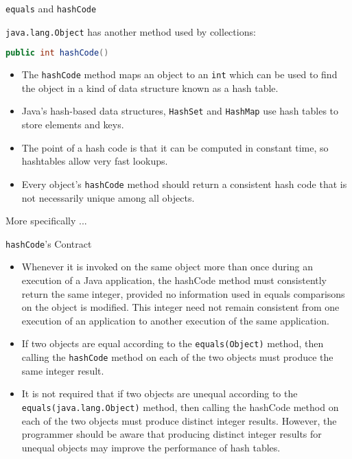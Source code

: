 \documentclass{beamer}
\begin{document}
\begin{frame}[fragile]{{\tt equals} and {\tt hashCode}}

{\tt java.lang.Object} has another method used by collections:
\begin{lstlisting}[language=Java]
public int hashCode()
\end{lstlisting}
\begin{itemize}
\item The {\tt hashCode} method maps an object to an {\tt int} which can be used to find the object in a kind of data structure known as a hash table.
\item Java's hash-based data structures, {\tt HashSet} and {\tt HashMap} use hash tables to store elements and keys.
\item The point of a hash code is that it can be computed in constant time, so hashtables allow very fast lookups.
\item Every object's {\tt hashCode} method should return a consistent hash code that  is not necessarily unique among all objects.
\end{itemize}

More specifically ...

\end{frame}

\begin{frame}[fragile]{{\tt hashCode}'s Contract}
\vspace{-.12in}
\begin{itemize}
\item Whenever it is invoked on the same object more than once during an execution of a Java application, the hashCode method must consistently return the same integer, provided no information used in equals comparisons on the object is modified. This integer need not remain consistent from one execution of an application to another execution of the same application.
\item If two objects are equal according to the {\tt equals(Object)} method, then calling the {\tt hashCode} method on each of the two objects must produce the same integer result.
\item It is not required that if two objects are unequal according to the {\tt equals(java.lang.Object)} method, then calling the hashCode method on each of the two objects must produce distinct integer results. However, the programmer should be aware that producing distinct integer results for unequal objects may improve the performance of hash tables.
\end{itemize}

\end{frame}
\end{document}

